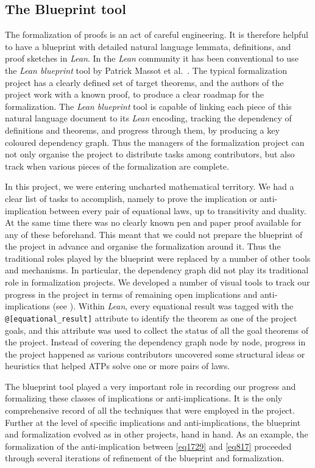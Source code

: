 \subsection{The Blueprint tool}

The formalization of proofs is an act of careful engineering. It is therefore helpful to  have a blueprint with detailed natural language lemmata, definitions, and proof sketches in \emph{Lean}. In the \emph{Lean} community it has been conventional to use the  \emph{Lean blueprint} tool by Patrick Massot et al.~\cite{GitHubGitHubPatrickMassotleanblueprint}. The typical formalization project has a clearly defined set of target theorems, and the authors of the project work with a known proof, to produce a clear roadmap for the formalization. The \emph{Lean blueprint} tool is capable of linking each piece of this natural language document to its \emph{Lean} encoding, tracking the dependency of definitions and theorems, and progress through them, by producing a key coloured dependency graph. Thus the managers of the formalization project can not only organise the project to distribute tasks among contributors, but also track when various pieces of the formalization are complete.

In this project, we were entering uncharted mathematical territory. We had a clear list of tasks to accomplish, namely to prove the implication or anti-implication between every pair of equational laws, up to transitivity and duality. At the same time there was no clearly known pen and paper proof available for any of these beforehand. This meant that we could not prepare the blueprint of the project in advance and organise the formalization around it. Thus the traditional roles played by the blueprint were replaced by a number of other tools and mechanisms. In particular, the dependency graph did not play its traditional role in formalization projects. We developed a number of visual tools to track our progress in the project  in terms of remaining open implications and anti-implications (see ). Within \emph{Lean}, every equational result was tagged with the \texttt{@[equational\_result]} attribute to identify the theorem as one of the project goals, and this attribute was used to collect the status of all the goal theorems of the project. Instead of covering the dependency graph node by node, progress in the project happened as various contributors uncovered some structural ideas or heuristics that helped ATPs solve one or more pairs of laws.

The blueprint tool played a very important role in recording our progress and formalizing these classes of implications or anti-implications. It is the only comprehensive record of all the techniques that were employed in the project. Further at the level of specific implications and anti-implications, the blueprint and formalization evolved as in other projects, hand in hand. As an example, the formalization of the anti-implication between \eqref{eq1729} and \eqref{eq817} proceeded through several iterations of refinement of the blueprint and formalization.

